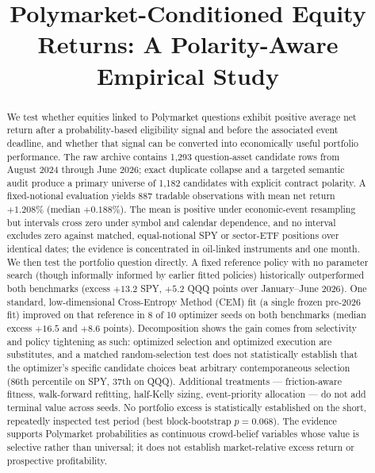 \documentclass[sigconf,anonymous]{acmart}
\begin{document}
\title{Polymarket-Conditioned Equity Returns: A Polarity-Aware Empirical Study}

\begin{abstract}
We test whether equities linked to Polymarket questions exhibit positive average net return after a probability-based eligibility signal and before the associated event deadline, and whether that signal can be converted into economically useful portfolio performance. The raw archive contains 1,293 question-asset candidate rows from August 2024 through June 2026; exact duplicate collapse and a targeted semantic audit produce a primary universe of 1,182 candidates with explicit contract polarity. A fixed-notional evaluation yields 887 tradable observations with mean net return $+1.208\%$ (median $+0.188\%$). The mean is positive under economic-event resampling but intervals cross zero under symbol and calendar dependence, and no interval excludes zero against matched, equal-notional SPY or sector-ETF positions over identical dates; the evidence is concentrated in oil-linked instruments and one month. We then test the portfolio question directly. A fixed reference policy with no parameter search (though informally informed by earlier fitted policies) historically outperformed both benchmarks (excess $+13.2$ SPY, $+5.2$ QQQ points over January--June 2026). One standard, low-dimensional Cross-Entropy Method (CEM) fit (a single frozen pre-2026 fit) improved on that reference in 8 of 10 optimizer seeds on both benchmarks (median excess $+16.5$ and $+8.6$ points). Decomposition shows the gain comes from selectivity and policy tightening as such: optimized selection and optimized execution are substitutes, and a matched random-selection test does not statistically establish that the optimizer's specific candidate choices beat arbitrary contemporaneous selection (86th percentile on SPY, 37th on QQQ). Additional treatments --- friction-aware fitness, walk-forward refitting, half-Kelly sizing, event-priority allocation --- do not add terminal value across seeds. No portfolio excess is statistically established on the short, repeatedly inspected test period (best block-bootstrap $p=0.068$). The evidence supports Polymarket probabilities as continuous crowd-belief variables whose value is selective rather than universal; it does not establish market-relative excess return or prospective profitability.
\end{abstract}

\end{document}

